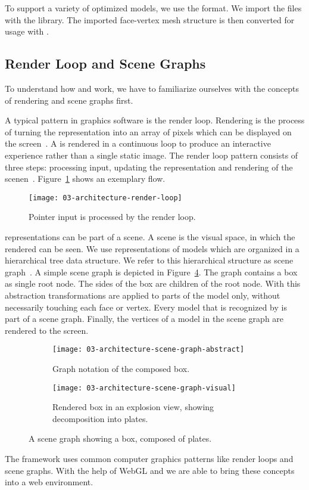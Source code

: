 \documentclass[../../ClassicThesis.tex]{subfiles}
\begin{document}
To support a variety of {\threedprinter} optimized models,
we use the {\stlfile} format. We import the files with the
{\meshlib} library. The imported face-vertex mesh structure
is then converted for usage with {\threejs}.

\subsection{Render Loop and Scene Graphs}
\label{sub:render-and-graph}

To understand how {\convertify} and {\platener} work, we
have to familiarize ourselves with the concepts of rendering
and scene graphs first.

A typical pattern in graphics software is the render loop.
Rendering is the process of turning the {\threedmodel}
representation into an array of pixels which can be
displayed on the screen~\cite[p.~2]{intro-cg}. A
{\threedmodel} is rendered in a continuous loop to produce
an interactive experience rather than a single static image.
The render loop pattern consists of three steps: processing
input, updating the {\threedmodel} representation and
rendering of the scenen~\cite{gamedev-gameloop}.
Figure~\ref{fig:render-loop} shows an exemplary flow.

\begin{figure}[h]
  \centering
  \texttt{[image: 03-architecture-render-loop]}
  \caption{Pointer input is processed by the render loop.}
  \label{fig:render-loop}
\end{figure}

{\threedmodel} representations can be part of a scene. A
scene is the visual space, in which the rendered
{\threedmodel} can be seen. We use representations of models
which are organized in a hierarchical tree data structure.
We refer to this hierarchical structure as scene
graph~\cite{scene-graph}. A simple scene graph is depicted
in Figure~\ref{fig:scene-graph}. The graph contains a box as
single root node. The sides of the box are children of the
root node. With this abstraction transformations are applied
to parts of the model only, without necessarily touching
each face or vertex. Every model that is recognized by
{\convertify} is part of a scene graph. Finally, the
vertices of a model in the scene graph are rendered to the
screen.

\begin{figure}[H]
  \centering
  \begin{subfigure}[b]{0.49\textwidth}
    \centering
    \texttt{[image: 03-architecture-scene-graph-abstract]}
    \caption{Graph notation of the composed box.}
    \label{fig:scene-graph:abstract}
  \end{subfigure}
  \begin{subfigure}[b]{0.49\textwidth}
    \centering
    \texttt{[image: 03-architecture-scene-graph-visual]}
    \caption{Rendered box in an explosion view, showing decomposition into plates.}
    \label{fig:scene-graph:visual}
  \end{subfigure}
  \caption{A scene graph showing a box, composed of plates.}
  \label{fig:scene-graph}
\end{figure}


The framework {\convertify} uses common computer graphics
patterns like render loops and scene graphs. With the help
of WebGL and {\threejs} we are able to bring these concepts
into a web environment.
\end{document}
